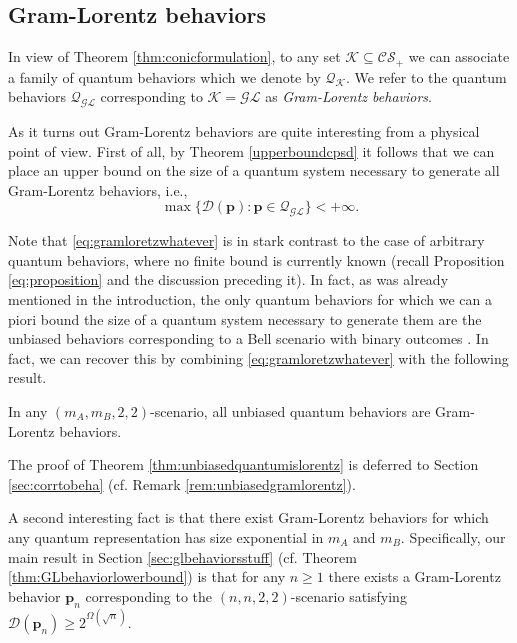 \documentclass{siamart}
\begin{document}
{{\subsection{Gram-Lorentz behaviors}\label{sec:unbiasedarelorentz}

In view of Theorem \ref{thm:conicformulation}, to any set ${\mathcal{K}}\subseteq
{\mathcal{CS}_+}$ we can associate a family  of quantum   behaviors which we denote by ${\mathcal{Q}}_{\mathcal{K}}$.
We refer to  the quantum behaviors ${\mathcal{Q}}_{\mathcal{GL}}$
corresponding to  ${\mathcal{K}}={\mathcal{GL}}$ as   {\em Gram-Lorentz behaviors}.

As it turns out   Gram-Lorentz behaviors are quite interesting from a physical point of view. First of all, by Theorem \ref{upperboundcpsd} it follows that we can place an upper bound on the size of a quantum system necessary to generate all Gram-Lorentz behaviors, i.e.,
\begin{equation}\label{eq:gramloretzwhatever}
\max\{ \mathcal{D}({\mathbf{p}}): {\mathbf{p}}\in {\mathcal{Q}}_{\mathcal{GL}}\}<+\infty.
\end{equation}

Note that \eqref{eq:gramloretzwhatever} is in stark contrast to the case of arbitrary quantum behaviors, where no finite  bound is currently known (recall Proposition \ref{eq:proposition} and the discussion preceding it).  In fact, as was already mentioned in the introduction,  the only  quantum behaviors for which we can a piori bound the size of a quantum system necessary to generate them  are the unbiased  behaviors corresponding to a Bell scenario with  binary outcomes \cite{TS87}.   In fact, we can recover this by combining   \eqref{eq:gramloretzwhatever} with  the following result.

\medskip
\begin{theorem}\label{thm:unbiasedquantumislorentz}
In any $(m_A,m_B,2,2)$-scenario, all unbiased quantum behaviors  are Gram-Lorentz behaviors.
\end{theorem}
\medskip

The proof of Theorem \ref{thm:unbiasedquantumislorentz} is deferred to Section \ref{sec:corrtobeha} (cf. Remark \ref{rem:unbiasedgramlorentz}).

A second  interesting fact   is that there exist Gram-Lorentz behaviors for which any quantum representation has  size  exponential in $m_A$ and $m_B$. Specifically, our main result in Section \ref{sec:glbehaviorsstuff} (cf. Theorem \ref{thm:GLbehaviorlowerbound}) is that for any  $n\ge 1$ there exists a Gram-Lorentz behavior ${\mathbf{p}}_n$ corresponding to the $(n,n,2,2)$-scenario satisfying~$\mathcal{D}({\mathbf{p}}_n)\ge 2^{\Omega(\sqrt{n})}.$

}}
\end{document}
